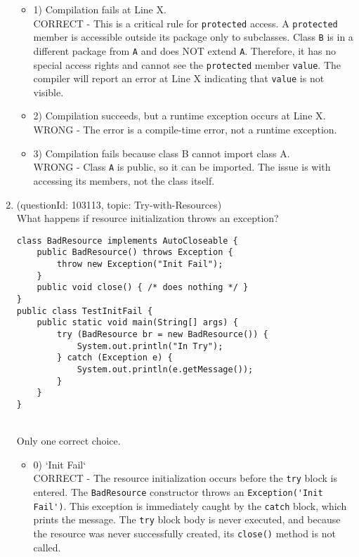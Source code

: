 \documentclass[12pt]{article}
\begin{document}
\begin{enumerate}[label=(\arabic*)]
\begin{itemize}
\item 1) Compilation fails at Line X.
 \\ 
CORRECT - This is a critical rule for \verb|protected| access. A \verb|protected| member is accessible outside its package only to subclasses. Class \verb|B| is in a different package from \verb|A| and does NOT extend \verb|A|. Therefore, it has no special access rights and cannot see the \verb|protected| member \verb|value|. The compiler will report an error at Line X indicating that \verb|value| is not visible.

\item 2) Compilation succeeds, but a runtime exception occurs at Line X.
 \\ 
WRONG - The error is a compile-time error, not a runtime exception.

\item 3) Compilation fails because class B cannot import class A.
 \\ 
WRONG - Class \verb|A| is public, so it can be imported. The issue is with accessing its members, not the class itself.

\end{itemize}
\item (questionId: 103113, topic: Try-with-Resources) \\ 
What happens if resource initialization throws an exception?
\begin{verbatim}
class BadResource implements AutoCloseable {
    public BadResource() throws Exception {
        throw new Exception("Init Fail");
    }
    public void close() { /* does nothing */ }
}
public class TestInitFail {
    public static void main(String[] args) {
        try (BadResource br = new BadResource()) {
            System.out.println("In Try");
        } catch (Exception e) {
            System.out.println(e.getMessage());
        }
    }
}
\end{verbatim}
\\ \noindent Only one correct choice. 
\begin{itemize}
\item 0) `Init Fail`
 \\ 
CORRECT - The resource initialization occurs before the \verb|try| block is entered. The \verb|BadResource| constructor throws an \verb|Exception('Init Fail')|. This exception is immediately caught by the \verb|catch| block, which prints the message. The \verb|try| block body is never executed, and because the resource was never successfully created, its \verb|close()| method is not called.


\end{itemize}
\end{enumerate}
\end{document}
